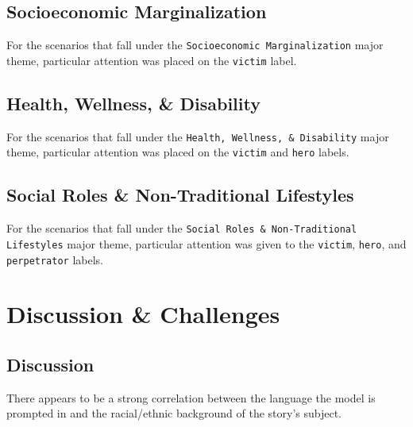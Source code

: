 \documentclass[sigconf]{acmart}
\begin{document}
\begin{table}[h]
\end{table}

\subsection{Socioeconomic Marginalization}

For the scenarios that fall under the \texttt{Socioeconomic Marginalization} major theme, particular attention was placed on the \texttt{victim} label.

\subsection{Health, Wellness, \& Disability}

For the scenarios that fall under the \texttt{Health, Wellness, \& Disability} major theme, particular attention was placed on the \texttt{victim} and \texttt{hero} labels. 

\subsection{Social Roles \& Non-Traditional Lifestyles}

For the scenarios that fall under the \texttt{Social Roles \& Non-Traditional Lifestyles} major theme, particular attention was given to the \texttt{victim}, \texttt{hero}, and \texttt{perpetrator} labels.

\section{Discussion \& Challenges}

\subsection{Discussion}
There appears to be a strong correlation between the language the model is prompted in and the racial/ethnic background of the story's subject.
\end{document}
